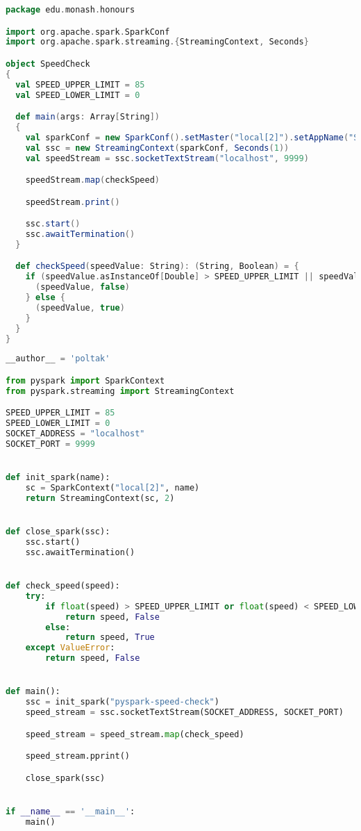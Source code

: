 \begin{lstlisting}[language=scala,caption=edu.monash.honours.SpeedCheck (Scala)]
package edu.monash.honours

import org.apache.spark.SparkConf
import org.apache.spark.streaming.{StreamingContext, Seconds}

object SpeedCheck
{
  val SPEED_UPPER_LIMIT = 85
  val SPEED_LOWER_LIMIT = 0

  def main(args: Array[String])
  {
    val sparkConf = new SparkConf().setMaster("local[2]").setAppName("SpeedCheck")
    val ssc = new StreamingContext(sparkConf, Seconds(1))
    val speedStream = ssc.socketTextStream("localhost", 9999)

    speedStream.map(checkSpeed)

    speedStream.print()

    ssc.start()
    ssc.awaitTermination()
  }

  def checkSpeed(speedValue: String): (String, Boolean) = {
    if (speedValue.asInstanceOf[Double] > SPEED_UPPER_LIMIT || speedValue.asInstanceOf[Double] < SPEED_LOWER_LIMIT) {
      (speedValue, false)
    } else {
      (speedValue, true)
    }
  }
}
\end{lstlisting}
\clearpage

\begin{lstlisting}[language=python,caption=edu.monash.honours.SpeedCheck (Python)]
__author__ = 'poltak'

from pyspark import SparkContext
from pyspark.streaming import StreamingContext

SPEED_UPPER_LIMIT = 85
SPEED_LOWER_LIMIT = 0
SOCKET_ADDRESS = "localhost"
SOCKET_PORT = 9999


def init_spark(name):
    sc = SparkContext("local[2]", name)
    return StreamingContext(sc, 2)


def close_spark(ssc):
    ssc.start()
    ssc.awaitTermination()


def check_speed(speed):
    try:
        if float(speed) > SPEED_UPPER_LIMIT or float(speed) < SPEED_LOWER_LIMIT:
            return speed, False
        else:
            return speed, True
    except ValueError:
        return speed, False


def main():
    ssc = init_spark("pyspark-speed-check")
    speed_stream = ssc.socketTextStream(SOCKET_ADDRESS, SOCKET_PORT)

    speed_stream = speed_stream.map(check_speed)

    speed_stream.pprint()

    close_spark(ssc)


if __name__ == '__main__':
    main()
\end{lstlisting}
